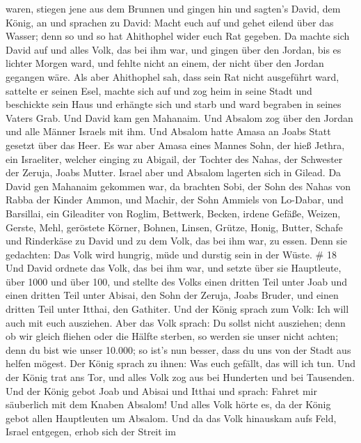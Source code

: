 waren, stiegen jene aus dem Brunnen und gingen hin und sagten's David,
dem König, an und sprachen zu David: Macht euch auf und gehet eilend
über das Wasser; denn so und so hat Ahithophel wider euch Rat gegeben.
 Da machte sich David auf und alles Volk, das bei ihm war,
und gingen über den Jordan, bis es lichter Morgen ward, und fehlte nicht
an einem, der nicht über den Jordan gegangen wäre.  Als
aber Ahithophel sah, dass sein Rat nicht ausgeführt ward, sattelte er
seinen Esel, machte sich auf und zog heim in seine Stadt und beschickte
sein Haus und erhängte sich und starb und ward begraben in seines Vaters
Grab.  Und David kam gen Mahanaim. Und Absalom zog über den
Jordan und alle Männer Israels mit ihm.  Und Absalom hatte
Amasa an Joabs Statt gesetzt über das Heer. Es war aber Amasa eines
Mannes Sohn, der hieß Jethra, ein Israeliter, welcher einging zu
Abigail, der Tochter des Nahas, der Schwester der Zeruja, Joabs Mutter.
 Israel aber und Absalom lagerten sich in Gilead.
 Da David gen Mahanaim gekommen war, da brachten Sobi, der
Sohn des Nahas von Rabba der Kinder Ammon, und Machir, der Sohn Ammiels
von Lo-Dabar, und Barsillai, ein Gileaditer von Roglim, 
Bettwerk, Becken, irdene Gefäße, Weizen, Gerste, Mehl, geröstete Körner,
Bohnen, Linsen, Grütze,  Honig, Butter, Schafe und
Rinderkäse zu David und zu dem Volk, das bei ihm war, zu essen. Denn sie
gedachten: Das Volk wird hungrig, müde und durstig sein in der Wüste. \#
18  Und David ordnete das Volk, das bei ihm war, und setzte
über sie Hauptleute, über 1000 und über 100,  und stellte
des Volks einen dritten Teil unter Joab und einen dritten Teil unter
Abisai, den Sohn der Zeruja, Joabs Bruder, und einen dritten Teil unter
Itthai, den Gathiter. Und der König sprach zum Volk: Ich will auch mit
euch ausziehen.  Aber das Volk sprach: Du sollst nicht
ausziehen; denn ob wir gleich fliehen oder die Hälfte sterben, so werden
sie unser nicht achten; denn du bist wie unser 10.000; so ist's nun
besser, dass du uns von der Stadt aus helfen mögest.  Der
König sprach zu ihnen: Was euch gefällt, das will ich tun. Und der König
trat ans Tor, und alles Volk zog aus bei Hunderten und bei Tausenden.
 Und der König gebot Joab und Abisai und Itthai und sprach:
Fahret mir säuberlich mit dem Knaben Absalom! Und alles Volk hörte es,
da der König gebot allen Hauptleuten um Absalom.  Und da das
Volk hinauskam aufs Feld, Israel entgegen, erhob sich der Streit im
